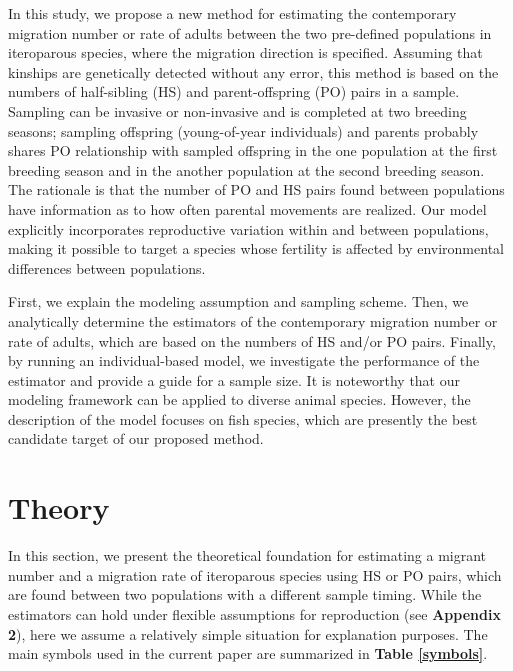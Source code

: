 \documentclass[12pt, English]{article}
\begin{document}
\begin{spacing}{1.9}

In this study, we propose a new method for estimating the contemporary migration number or rate of adults between the two pre-defined populations in iteroparous species, where the migration direction is specified. Assuming that kinships are genetically detected without any error, this method is based on the numbers of half-sibling (HS) and parent-offspring (PO) pairs in a sample. Sampling can be invasive or non-invasive and is completed at two breeding seasons; sampling offspring (young-of-year individuals) and parents probably shares PO relationship with sampled offspring in the one population at the first breeding season and in the another population at the second breeding season. The rationale is that the number of PO and HS pairs found between populations have information as to how often parental movements are realized. Our model explicitly incorporates reproductive variation within and between populations, making it possible to target a species whose fertility is affected by environmental differences between populations. 

First, we explain the modeling assumption and sampling scheme. Then, we analytically determine the estimators of the contemporary migration number or rate of adults, which are based on the numbers of HS and/or PO pairs. Finally, by running an individual-based model, we investigate the performance of the estimator and provide a guide for a sample size. It is noteworthy that our modeling framework can be applied to diverse animal species. However, the description of the model focuses on fish species, which are presently the best candidate target of our proposed method.

\section{Theory}\label{sec2}
In this section, we present the theoretical foundation for estimating a migrant number and a migration rate of iteroparous species using HS or PO pairs, which are found between two populations with a different sample timing. While the estimators can hold under flexible assumptions for reproduction (see {\bf Appendix 2}), here we assume a relatively simple situation for explanation purposes. The main symbols used in the current paper are summarized in {\bf Table \ref{symbols}}. 

\begin{center}
\end{center}


\end{spacing}
\end{document}
